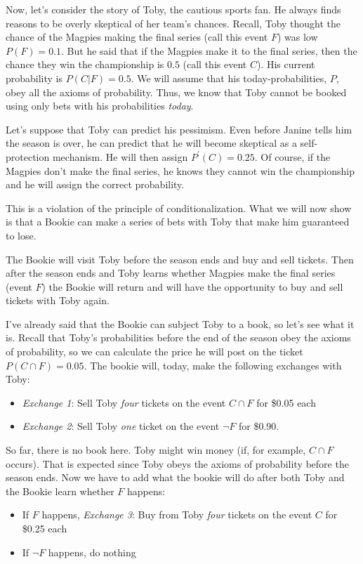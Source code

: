 Now, let's consider the story of Toby, the cautious sports fan. He always finds reasons to be overly skeptical of her team's chances.  Recall, Toby thought the chance of the Magpies making the final series (call this event $F$) was low $P(F) = 0.1$. But he said that if the Magpies make it to the final series, then the chance they win the championship is $0.5$ (call this event $C$). His current probability is $P(C|F) = 0.5$.  We will assume that his today-probabilities, $P$, obey all the axioms of probability. Thus, we know that Toby cannot be booked using only bets with his probabilities {\it today}.

Let's suppose that Toby can predict his pessimism. Even before Janine tells him the season is over, he can predict that he will become skeptical as a self-protection mechanism. He will then assign $P^\prime(C) = 0.25$.  Of course, if the Magpies don't make the final series, he knows they cannot win the championship and he will assign the correct probability.

This is a violation of the principle of conditionalization.  What we will now show is that a Bookie can make a series of bets with Toby that make him guaranteed to lose. 

The Bookie will visit Toby before the season ends and buy and sell tickets.  Then after the season ends and Toby learns whether Magpies make the final series (event $F$) the Bookie will return and will have the opportunity to buy and sell tickets with Toby again.

I've already said that the Bookie can subject Toby to a book, so let's see what it is.  Recall that Toby's probabilities before the end of the season obey the axioms of probability, so we can calculate the price he will post on the ticket $P(C \cap F) = 0.05$.  The bookie will, today, make the following exchanges with Toby:
\begin{itemize}
    \item {\it Exchange 1}: Sell Toby {\it four} tickets on the event $C \cap F$ for \$0.05 each
    \item {\it Exchange 2}: Sell Toby {\it one} ticket on the event $\neg F$ for \$0.90.
\end{itemize}
So far, there is no book here.  Toby might win money (if, for example, $C \cap F$ occurs). That is expected since Toby obeys the axioms of probability before the season ends. Now we have to add what the bookie will do after both Toby and the Bookie learn whether $F$ happens:
\begin{itemize}
    \item If $F$ happens, {\it Exchange 3}: Buy from Toby {\it four} tickets on the event $C$ for \$0.25 each
    \item If $\neg F$ happens, do nothing
\end{itemize}

